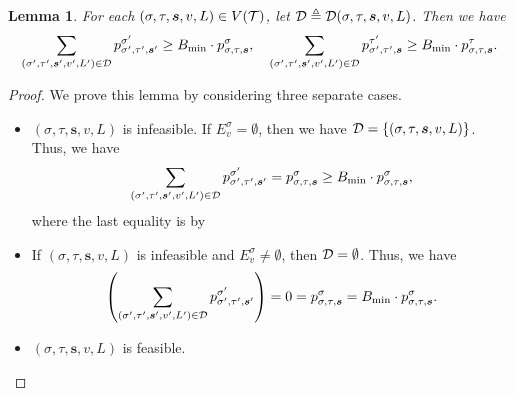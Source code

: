 \documentclass[11pt]{article}
\newtheorem{lemma}[theorem]{Lemma}
\newcommand{\seqS}{\boldsymbol{s}}
\begin{document}
    \begin{lemma} \label{lem:coupling-error}
       For each $(\sigma, \tau, \seqS, v, L) \in V(\+T)$,
       let $\+D \triangleq \+D(\sigma, \tau, \seqS, v, L)$.
       Then we have
       \begin{align}\label{eqn-error-bound}
           \sum_{(\sigma', \tau', \seqS',v',L') \in \+D} p^{\sigma'}_{\sigma', \tau', \seqS'}\geq  B_{\min} \cdot p^{\sigma}_{\sigma, \tau, \seqS}, \quad \sum_{(\sigma',\tau', \seqS',v',L') \in \+D} p^{\tau'}_{\sigma', \tau', \seqS} \geq  B_{\min} \cdot p^{\tau}_{\sigma,\tau, \seqS}.
       \end{align}
    \end{lemma}
    \begin{proof}
    We prove this lemma by considering three separate cases.
    \begin{itemize}
    \item $(\sigma,\tau,\seqS,v,L)$ is infeasible.
    If $E^{\sigma}_v = \emptyset$, then we have $\+D = \{(\sigma,\tau,\seqS,v,L)\}$.
    Thus, we have 
    \[\sum_{(\sigma', \tau', \seqS',v',L') \in \+D} p^{\sigma'}_{\sigma', \tau', \seqS'} = p^{\sigma}_{\sigma, \tau, \seqS} \geq  B_{\min} \cdot p^{\sigma}_{\sigma, \tau, \seqS},\]
    where the last equality is by 
   
    \item If $(\sigma,\tau,\seqS,v,L)$ is infeasible and $E^{\sigma}_v \neq \emptyset$, then 
    $\mathcal{D} =\emptyset$.
    Thus, we have 
    \[\left(\sum_{(\sigma', \tau', \seqS',v',L') \in \+D} p^{\sigma'}_{\sigma', \tau', \seqS'}\right) = 0 = p^{\sigma}_{\sigma, \tau, \seqS} =  B_{\min} \cdot p^{\sigma}_{\sigma, \tau, \seqS}.\]
    \item $(\sigma,\tau,\seqS,v,L)$ is feasible.
    
    \end{itemize}
 




\end{proof}
\end{document}
